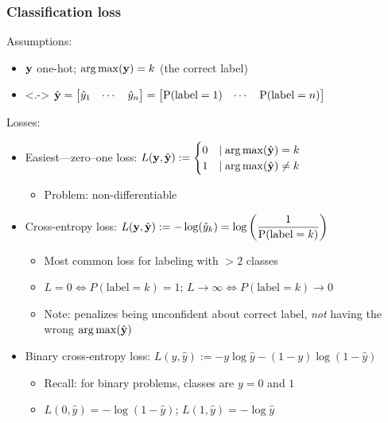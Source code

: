 \begin{frame}
    \frametitle{Classification loss}
    Assumptions:
    \begin{itemize}
        \item<+-> $\mathbf{y}$ one-hot; $\operatorname*{arg\,max}(\mathbf{y}) = k$ (the correct label)
        \item<.-> $\hat{\mathbf{y}} =
        \begin{bmatrix}
            \hat{y}_1 & \cdots & \hat{y}_n
        \end{bmatrix} =
        \begin{bmatrix}
            \operatorname{\mathrm{P}}(\text{label} = 1) & \cdots & \operatorname{\mathrm{P}}(\text{label} = n)
        \end{bmatrix}$
    \end{itemize}

    Losses:
    \begin{itemize}[<+->]
        \item Easiest---zero--one loss: $L(\mathbf{y}, \hat{\mathbf{y}}) := \begin{cases}
            0 &\mid \operatorname*{arg\,max}(\hat{\mathbf{y}}) = k \\
            1 &\mid \operatorname*{arg\,max}(\hat{\mathbf{y}}) \ne k
        \end{cases}$
        \begin{itemize}
            \item Problem: non-differentiable
        \end{itemize}
        \item Cross-entropy loss: $L(\mathbf{y}, \hat{\mathbf{y}}) := -\log(\hat{y}_k) = \log\left(\dfrac{1}{\operatorname{\mathrm{P}}(\text{label} = k)}\right)$
        \begin{itemize}
            \item Most common loss for labeling with $> 2$ classes
            \item $L = 0 \iff P(\text{label} = k) = 1$;
            $L \to \infty \iff P(\text{label} = k) \to 0$
            \item Note: penalizes being unconfident about correct label, \emph{not} having the wrong $\operatorname*{arg\,max}(\hat{\mathbf{y}})$
        \end{itemize}
        \item Binary cross-entropy loss: $L(y, \hat{y}) := -y \log \hat{y} - (1 - y) \log(1 - \hat{y})$
        \begin{itemize}
            \item Recall: for binary problems, classes are $y = 0$ and $1$
            \item $L(0, \hat{y}) = -\log(1 - \hat{y})$; $L(1, \hat{y}) = -\log \hat{y}$
        \end{itemize}
    \end{itemize}
\end{frame}

